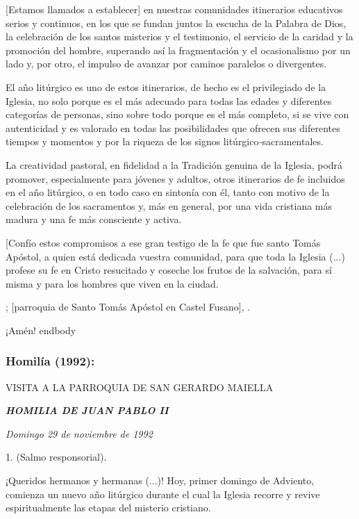 \begin{body}
	{[}Estamos llamados a establecer{]} en nuestras comunidades itinerarios educativos serios y continuos, en los que se fundan juntos la escucha de la Palabra de Dios, la celebración de los santos misterios y el testimonio, el servicio de la caridad y la promoción del hombre, superando así la fragmentación y el ocasionalismo por un lado y, por otro, el impulso de avanzar por caminos paralelos o divergentes.
	
	El año litúrgico es uno de estos itinerarios, de hecho es el privilegiado de la Iglesia, no solo porque es el más adecuado para todas las edades y diferentes categorías de personas, sino sobre todo porque es el más completo, si se vive con autenticidad y es valorado en todas las posibilidades que ofrecen sus diferentes tiempos y momentos y por la riqueza de los signos litúrgico\emph{-}sacramentales.
	
	La creatividad pastoral, en fidelidad a la Tradición genuina de la Iglesia, podrá promover, especialmente para jóvenes y adultos, otros itinerarios de fe incluidos en el año litúrgico, o en todo caso en sintonía con él, tanto con motivo de la celebración de los sacramentos y, más en general, por una vida cristiana más madura y una fe más consciente y activa.
	
	{[}Confío estos compromisos a ese gran testigo de la fe que fue santo Tomás Apóstol, a quien está dedicada vuestra comunidad, para que toda la Iglesia (...) profese su fe en Cristo resucitado y coseche los frutos de la salvación, para sí misma y para los hombres que viven en la ciudad.
	
	; {[}parroquia de Santo Tomás Apóstol en Castel Fusano{]}, .
	
	¡Amén!
	end{body}
	
	\subsubsection{Homilía (1992): }
	
	VISITA A LA PARROQUIA DE SAN GERARDO MAIELLA
	
	\emph{\textbf{HOMILIA DE JUAN PABLO II}}
	
	\emph{Domingo 29 de noviembre de 1992}
	
	\begin{body}
		1. \emph{} (Salmo responsorial).
		
		¡Queridos hermanos y hermanas (...)! Hoy, primer domingo de Adviento, comienza un nuevo año litúrgico durante el cual la Iglesia recorre y revive espiritualmente las etapas del misterio cristiano.
		

\end{body}
\end{body}
